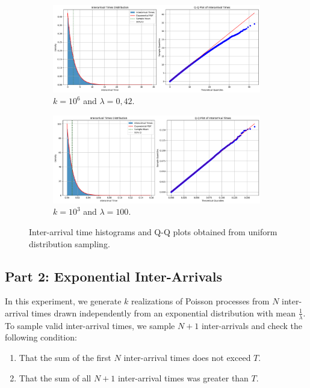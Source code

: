\documentclass[a4paper]{article}
\begin{document}
\begin{figure}[htbp]
  \centering
  \begin{subfigure}[b]{0.48\textwidth}
    \centering
    \includegraphics[width=\textwidth]{images/ex1-p1.png}
    \caption{$k = 10^6$ and $\lambda = 0,42$.}\label{fig:ex1-p1}
  \end{subfigure}
  \hfill
  \begin{subfigure}[b]{0.48\textwidth}
    \centering
    \includegraphics[width=\textwidth]{images/ex1-p1-hl.png}
    \caption{$k = 10^3$ and $\lambda = 100$.}\label{fig:ex1-p1-hl}
  \end{subfigure}
  \caption{Inter-arrival time histograms and Q-Q plots obtained from
  uniform distribution sampling.}\label{fig:ex1-p1-combined}
\end{figure}

\subsection*{Part 2: Exponential Inter-Arrivals}

In this experiment, we generate $k$ realizations of Poisson processes
from $N$ inter-arrival times drawn independently from an exponential
distribution with mean $\frac{1}{\lambda}$.
To sample valid inter-arrival times, we sample $N+1$ inter-arrivals and check the following condition:
\begin{enumerate}
    \setlength\itemsep{0.01em}

  \item That the sum of the first $N$ inter-arrival times does not exceed $T$.
  \item That the sum of all $N+1$ inter-arrival times was greater than $T$.
\end{enumerate}
\end{document}
